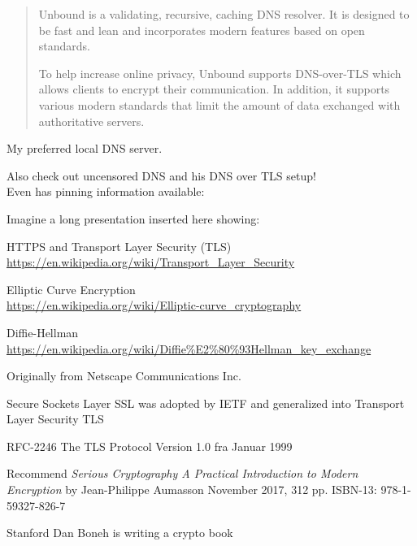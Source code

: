 \documentclass[Screen16to9,17pt]{foils}
\begin{document}



\begin{quote}
Unbound is a validating, recursive, caching DNS resolver. It is designed to be fast and lean and incorporates modern features based on open standards.

To help increase online privacy, Unbound supports DNS-over-TLS which allows clients to encrypt their communication. In addition, it supports various modern standards that limit the amount of data exchanged with authoritative servers.
\end{quote}


My preferred local DNS server.

Also check out uncensored DNS and his DNS over TLS setup!\\
Even has pinning information available:\\ {\small{}}






 Imagine a long presentation inserted here showing:
\begin{list2}
\item HTTPS and Transport Layer Security (TLS)\\ \url{https://en.wikipedia.org/wiki/Transport_Layer_Security}
\item Elliptic Curve Encryption\\
\url{https://en.wikipedia.org/wiki/Elliptic-curve_cryptography}
\item Diffie-Hellman\\
 \url{https://en.wikipedia.org/wiki/Diffie%E2%80%93Hellman_key_exchange}
\end{list2}



\begin{list2}
\item Originally from Netscape Communications Inc.
\item Secure Sockets Layer SSL was adopted by IETF and generalized into Transport Layer Security TLS

\item RFC-2246 The TLS Protocol Version 1.0 fra Januar 1999
\item Recommend \emph{Serious Cryptography
A Practical Introduction to Modern Encryption}
by Jean-Philippe Aumasson
November 2017, 312 pp.
ISBN-13:
978-1-59327-826-7
\item Stanford Dan Boneh is writing a crypto book\\ 
\end{list2}
\end{document}
